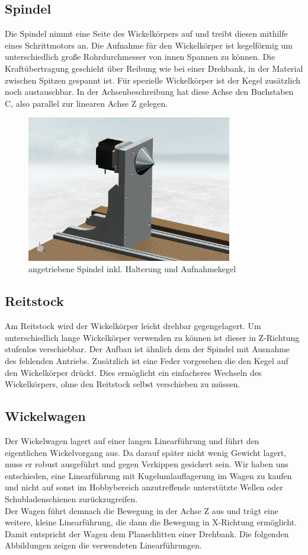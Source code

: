 \documentclass[paper=A4,pagesize,DIV=18, 12pt,listof=totoc,bibliography=totoc,headings=optiontohead,open=any]{article}
\begin{document}
\subsection{Spindel}
Die Spindel nimmt eine Seite des Wickelkörpers auf und treibt diesen mithilfe eines Schrittmotors an. Die Aufnahme für den Wickelkörper ist kegelförmig um unterschiedlich große Rohrdurchmesser von innen Spannen zu können. Die Kraftübertragung geschieht über Reibung wie bei einer Drehbank, in der Material zwischen Spitzen gespannt ist. Für spezielle Wickelkörper ist der Kegel zusätzlich noch austauschbar. In der Achsenbeschreibung hat diese Achse den Buchstaben C, also parallel zur linearen Achse Z gelegen.

\begin{figure}[H]
	\centering
	\includegraphics[width=0.8\textwidth]{NX_Screenshots/spindel.png}
	\caption{angetriebene Spindel inkl. Halterung und Aufnahmekegel} 
	\label{fig:spindel}
\end{figure}

\subsection{Reitstock}
Am Reitstock wird der Wickelkörper leicht drehbar gegengelagert. Um unterschiedlich lange Wickelkörper verwenden zu können ist dieser in Z-Richtung stufenlos verschiebbar. Der Aufbau ist ähnlich dem der Spindel mit Ausnahme des fehlenden Antriebs. Zusätzlich ist eine Feder vorgesehen die den Kegel auf den Wickelkörper drückt. Dies ermöglicht ein einfacheres Wechseln des Wickelkörpers, ohne den Reitstock selbst verschieben zu müssen.


\subsection{Wickelwagen}
Der Wickelwagen lagert auf einer langen Linearführung und führt den eigentlichen Wickelvorgang aus. Da darauf später nicht wenig Gewicht lagert, muss er robust ausgeführt und gegen Verkippen gesichert sein. Wir haben uns entschieden, eine Linearführung mit Kugelumlauflagerung im Wagen zu kaufen und nicht auf sonst im Hobbybereich anzutreffende unterstützte Wellen oder Schubladenschienen zurückzugreifen.\\
Der Wagen führt demnach die Bewegung in der Achse Z aus und trägt eine weitere, kleine Linearführung, die dann die Bewegung in X-Richtung ermöglicht. Damit entspricht der Wagen dem Planschlitten einer Drehbank. Die folgenden Abbildungen zeigen die verwendeten Linearführungen.
\end{document}
